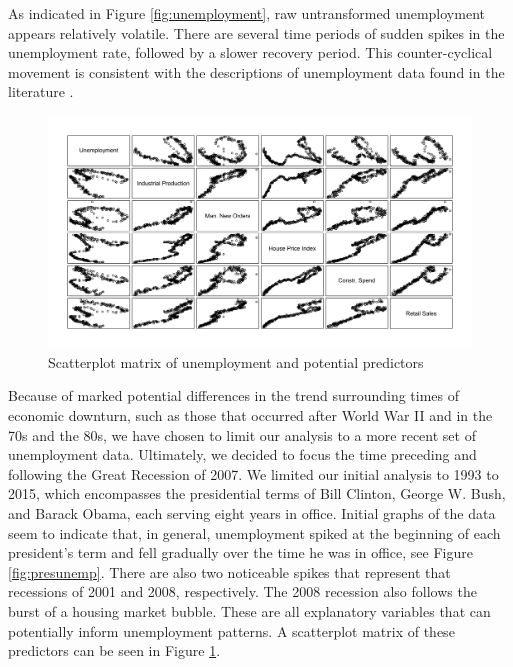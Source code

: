 \documentclass[twoside,twocolumn]{article}
\begin{document}
As indicated in Figure  \ref{fig:unemployment}, raw untransformed unemployment appears relatively volatile.  There are several time periods of sudden spikes in the unemployment rate, followed by a slower recovery period. This counter-cyclical movement is consistent with the descriptions of unemployment data found in the literature \citep{katz2010, Montgomery1998, shimer2012reassessing}. 
	
		\begin{figure}[htb]
		\caption{Scatterplot matrix of unemployment and potential predictors}
		\label{fig:pred_scatt}
		\includegraphics[width=\linewidth]{images/pred_scatt}
	\end{figure}

Because of marked potential differences in the trend surrounding times of economic downturn, such as those that occurred after World War II and in the 70s and the 80s, we have chosen to limit our analysis to a more recent set of unemployment data. Ultimately, we decided to focus the time preceding and following the Great Recession of 2007. We limited our initial analysis to 1993 to 2015, which encompasses the presidential terms of Bill Clinton, George W. Bush, and Barack Obama, each serving eight years in office.  Initial graphs of the data seem to indicate that, in general, unemployment spiked at the beginning of each president's term and fell gradually over the time he was in office, see Figure \ref{fig:presunemp}. There are also two noticeable spikes that represent that recessions of 2001 and 2008, respectively.  The 2008 recession also follows the burst of a housing market bubble.  These are all explanatory variables that can potentially inform unemployment patterns. A scatterplot matrix  of these predictors can be seen in Figure \ref{fig:pred_scatt}.

\end{document}
